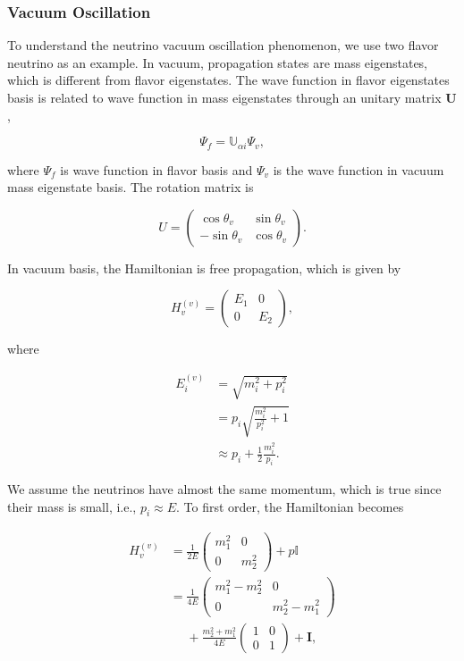 \documentclass[%
 aip,
 jmp,%
 amsmath,amssymb,
 reprint,%
]{revtex4-1}
\begin{document}
\subsubsection{Vacuum Oscillation}

To understand the neutrino vacuum oscillation phenomenon, we use two flavor neutrino as an example. In vacuum, propagation states are mass eigenstates, which is different from flavor eigenstates. The wave function in flavor eigenstates basis is related to wave function in mass eigenstates through an unitary matrix $\mathbf U$,

\begin{equation}
\Psi_f = \mathbb{U}_{\alpha i}\Psi_{v},
\end{equation}

where $\Psi_f$ is wave function in flavor basis and $\Psi_v$ is the wave function in vacuum mass eigenstate basis. The rotation matrix is

\begin{equation}
U = \begin{pmatrix} \cos\theta_v & \sin \theta_v \\ -\sin \theta_v & \cos \theta_v \end{pmatrix}.
\end{equation}

In vacuum basis, the Hamiltonian is free propagation, which is given by

\begin{equation}
H_v^{(v)} = \begin{pmatrix} E_1 & 0 \\
0 & E_2
\end{pmatrix},
\end{equation}

where

\begin{align}
E_i^{(v)} & = \sqrt{m_i^2 + p_i^2 } \\
& = p_i \sqrt{\frac{m_i^2}{p_i^2} + 1} \\
& \approx p_i + \frac{1}{2} \frac{m_i^2}{p_i}.
\end{align}

We assume the neutrinos have almost the same momentum, which is true since their mass is small, i.e., $p_i \approx E$. To first order, the Hamiltonian becomes

\begin{align*}
H_v^{(v)} &= \frac{1}{2E} \begin{pmatrix}
m_1^2 & 0 \\
0 & m_2^2
\end{pmatrix} + p \mathbb{I}\\
& =  \frac{1}{4E} \begin{pmatrix}
m_1^2 - m_2^2 & 0 \\
0 & m_2^2 - m_1^2
\end{pmatrix} \\
&\phantom{=}+ \frac{m_2^2 + m_1^2}{4E} \begin{pmatrix}
1 & 0 \\
0 & 1
\end{pmatrix} + \mathbf{I},
\end{align*}
\end{document}
